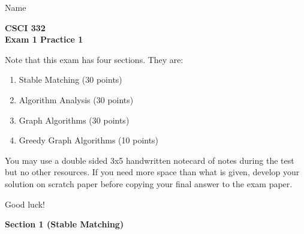 \documentclass[11pt]{article}
\begin{document}
\noindent Name \underline{\hspace{12cm}}\\


\begin{center}
\Large\textbf{CSCI 332}%
\\
\LARGE\textbf{Exam 1 Practice 1}%
\end{center}

\noindent Note that this exam has four sections. They are:

\begin{enumerate}
    \item Stable Matching (30 points)
    \item Algorithm Analysis (30 points)
    \item Graph Algorithms (30 points)
    \item Greedy Graph Algorithms (10 points)
\end{enumerate}

You may use a double sided 3x5 handwritten notecard of notes during the test but no other resources.
If you need more space than what is given, develop your solution on scratch paper before copying your final answer to the exam paper.

Good luck!

\newpage

\begin{center}
\LARGE\textbf{Section 1 (Stable Matching)\\}%
\end{center}
\end{document}
